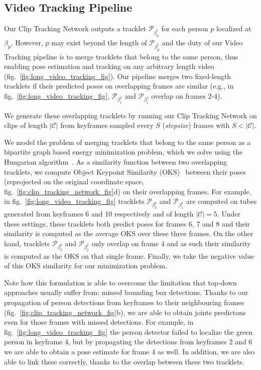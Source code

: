 \documentclass[10pt,twocolumn,letterpaper]{article}
\begin{document}
\subsection{Video Tracking Pipeline}\label{sec:tracking}

Our Clip Tracking Network outputs a tracklet  $\mathcal{P}_{\beta_p^t}$ for each person $p$ localized at $\beta_p$. However, $p$ may exist beyond the length of  $\mathcal{P}_{\beta_p^t}$ and the duty of our Video Tracking pipeline is to merge tracklets that belong to the same person, thus enabling pose estimation and tracking on any arbitrary length video (fig.~\ref{fig:long_video_tracking_fig}). 
Our pipeline merges two fixed-length tracklets if their predicted poses on overlapping frames are similar (e.g., in fig.~\ref{fig:long_video_tracking_fig}, $\mathcal{P}_{\beta_1^2}$ and $\mathcal{P}_{\beta_1^4}$ overlap on frames 2-4).

We generate these overlapping tracklets by running our Clip Tracking Network on clips of length $|\mathcal{C}|$ from keyframes sampled every $S$ ({\it stepsize})  frames with $S<|\mathcal{C}|$. 

We model the problem of merging tracklets that belong to the same person as a bipartite graph based energy minimization problem, which we solve using the Hungarian algorithm~\cite{kuhn1955hungarian}.
As a similarity function between two overlapping tracklets, we compute Object Keypoint Similarity (OKS)~\cite{lin2014microsoft,ronchi17iccv} between their poses (reprojected on the original coordinate space, fig.~\ref{fig:clip_tracking_network_fig}{\color{red}d}) on their overlapping frames. For example, in fig.~\ref{fig:long_video_tracking_fig} tracklets {\small $\mathcal{P}_{\beta_3^{6}}$ and $\mathcal{P}_{\beta_1^{8}}$} are computed on tubes generated from keyframes 6 and 10 respectively and of length $|\mathcal{C}|=5$. Under these settings, these tracklets both predict poses for frames 6, 7 and 8 and their similarity is computed as the average OKS over these three frames. On the other hand, tracklets {\small $\mathcal{P}_{\beta_3^{6}}$ and $\mathcal{P}_{\beta_2^{2}}$} only overlap on frame 4 and as such their similarity is computed as the OKS on that single frame. Finally, we take the negative value of this OKS similarity for our minimization problem. 

Note how this formulation is able to overcome the limitation that top-down approaches usually suffer from: missed bounding box detections. Thanks to our propagation of person detections from keyframes to their neighbouring frames (fig.~\ref{fig:clip_tracking_network_fig}{\color{red}b}), we are able to obtain joints predictons even for those frames with missed detections. For example, in fig.~\ref{fig:long_video_tracking_fig} the person detector failed to localize the green person in keyframe 4, but by propagating the detections from keyframes 2 and 6 we are able to obtain a pose estimate for frame 4 as well. In addition, we are also able to link these correctly, thanks to the overlap between these two tracklets. 
\end{document}
